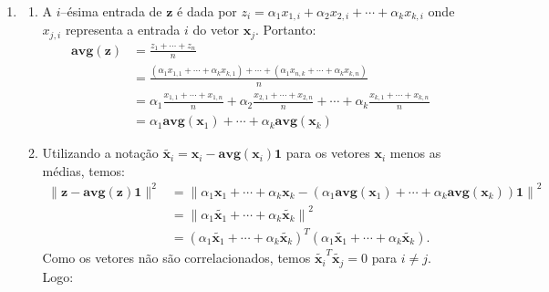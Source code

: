 \documentclass[a4paper,12pt]{article}
\newcommand{\avg}{\mathbf{\textbf{avg}}}
\newcommand{\vect}[1]{\mathbf{#1}}
\newcommand{\inner}[2]{\langle #1, #2 \rangle}
\newcommand{\norm}[1]{\left \| #1 \right \|}
\begin{document}
\begin{enumerate}
\begin{enumerate}
        \item Queremos encontrar $k$ tal que $\inner{\vect{u}}{\vect{v}} = 0$:
        \begin{align*}
            \inner{\vect{u}}{\vect{v}} & = k^2 - k - 6 = 0
        \end{align*}
        Resolvendo a equação quadrática:
        \begin{align*}
            k & = \frac{1 \pm \sqrt{1 + 24}}{2}\\
            & = \frac{1 \pm 5}{2}
        \end{align*}
        Portanto, $k = 3$ ou $k = -2$.
    \end{enumerate}
    \item \begin{enumerate}
        \item A $i$--ésima entrada de $\vect{z}$ é dada por $z_i = \alpha_1 x_{1,i} + \alpha_2 x_{2,i} + \cdots +\alpha_k x_{k,i}$ onde $x_{j,i}$ representa a entrada $i$ do vetor $\vect{x}_j$. Portanto:
        \begin{align*}
            \avg(\vect{z}) & = \frac{z_1 + \cdots + z_n}{n}\\
            & = \frac{(\alpha_1 x_{1,1} + \cdots + \alpha_k x_{k,1}) + \cdots +(\alpha_1 x_{n,k} + \cdots + \alpha_k x_{k,n})}{n}\\
            & = \alpha_1 \frac{x_{1,1} + \cdots + x_{1,n}}{n} + \alpha_2 \frac{x_{2,1} + \cdots + x_{2,n}}{n} + \cdots + \alpha_k \frac{x_{k,1} + \cdots + x_{k,n}}{n}\\
            &= \alpha_1 \avg(\vect{x}_1) + \cdots + \alpha_k \avg(\vect{x}_k)
        \end{align*}
    \item Utilizando a notação $\tilde{\vect{x}_i} = \vect{x}_i - \avg(\vect{x}_i)\vect{1}$ para os vetores $\vect{x}_i$ menos as médias, temos:
    \begin{align*}
        \|\vect{z} - \avg(\vect{z})\vect{1}\|^2 & = \norm{\alpha_1\vect{x}_1 + \cdots + \alpha_k \vect{x}_k - (\alpha_1 \avg(\vect{x}_1) + \cdots + \alpha_k \avg(\vect{x}_k))\vect{1}}^2\\
        &= \norm{\alpha_1\tilde{\vect{x}_1} + \cdots + \alpha_k\tilde{\vect{x}_k}}^2\\
        &= (\alpha_1\tilde{\vect{x}_1} + \cdots + \alpha_k\tilde{\vect{x}_k})^T(\alpha_1\tilde{\vect{x}_1} + \cdots + \alpha_k\tilde{\vect{x}_k}).
    \end{align*}
    Como os vetores não são correlacionados, temos $\tilde{\vect{x}_i}^T\tilde{\vect{x}_j} = 0$ para $i \neq j$. Logo:

\end{enumerate}
\end{enumerate}
\end{document}
